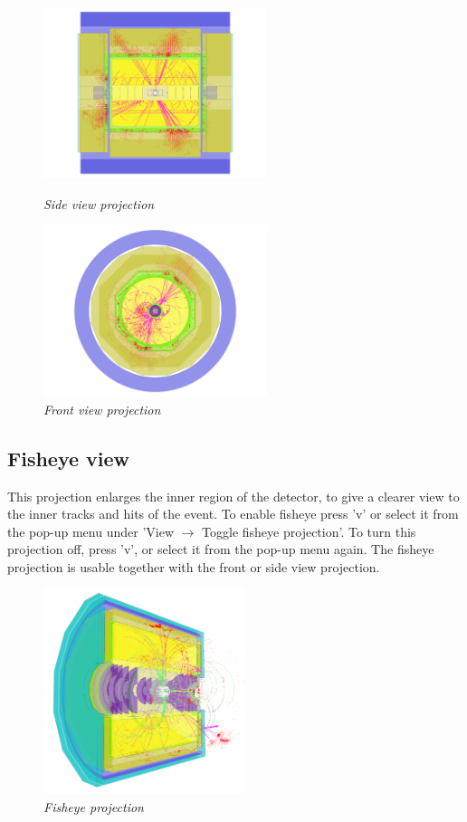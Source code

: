 \documentclass[a4paper,10pt]{article}
\begin{document}
\begin{figure}[h!]
\begin{minipage}[t]{6cm}
\centerline{\includegraphics[height=5cm]{sideview2.png}}
\caption{\label{CEDViewer} \textsl{Side view projection}}
\end{minipage}
\hfill
\begin{minipage}[t]{6cm}
\setlength{\fboxsep}{0mm}
\centerline{\includegraphics[height=5cm]{frontview2.png}}
\caption{\label{DSTViewer}\textsl{Front view projection}}
\end{minipage}
\end{figure}

\subsection{Fisheye view}
This projection enlarges the inner region of the detector, to give a clearer view to the inner tracks and hits of the event. To enable fisheye press 'v' or select it from the pop-up menu under 'View $\rightarrow$ Toggle fisheye projection'. To turn this projection off, press 'v', or select it from the pop-up menu again. The fisheye projection is usable together with the front or side view projection.

\begin{figure}[h]
\centerline{ \includegraphics[height=6cm]{fisheye1.png}}
\caption{\label{CEDViewer} \textsl{Fisheye projection}}
\end{figure}
\end{document}
